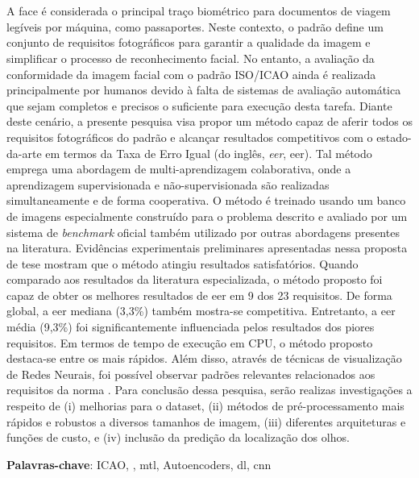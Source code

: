 \section*{}

\noindent
A face é considerada o principal traço biométrico para documentos de viagem legíveis por máquina, como passaportes. Neste contexto, o padrão \icao define um conjunto de requisitos fotográficos para garantir a qualidade da imagem e simplificar o processo de reconhecimento facial. No entanto, a avaliação da conformidade da imagem facial com o padrão ISO/ICAO ainda é realizada principalmente por humanos devido à falta de sistemas de avaliação automática que sejam completos e precisos o suficiente para execução desta tarefa. Diante deste cenário, a presente pesquisa visa propor um método capaz de aferir todos os requisitos fotográficos do padrão \icao e alcançar resultados competitivos com o estado-da-arte em termos da Taxa de Erro Igual (do inglês, \textit{\acl{eer}}, \acs{eer}). Tal método emprega uma abordagem de multi-aprendizagem colaborativa, onde a aprendizagem supervisionada e não-supervisionada são realizadas simultaneamente e de forma cooperativa. O método é treinado usando um banco de imagens especialmente construído para o problema descrito e avaliado por um sistema de \textit{benchmark} oficial também utilizado por outras abordagens presentes na literatura. Evidências experimentais preliminares apresentadas nessa proposta de tese mostram que o método atingiu resultados satisfatórios. Quando comparado aos resultados da literatura especializada, o método proposto foi capaz de obter os melhores resultados de \acs{eer} em 9 dos 23 requisitos. De forma global, a \acs{eer} mediana (3,3\%) também mostra-se competitiva. Entretanto, a \acs{eer} média (9,3\%) foi significantemente influenciada pelos resultados dos piores requisitos. Em termos de tempo de execução em CPU, o método proposto destaca-se entre os mais rápidos. Além disso, através de técnicas de visualização de Redes Neurais, foi possível observar padrões relevantes relacionados aos requisitos da norma \icao. Para conclusão dessa pesquisa, serão realizas investigações a respeito de (i) melhorias para o dataset, (ii) métodos de pré-processamento mais rápidos e robustos a diversos tamanhos de imagem, (iii) diferentes arquiteturas e funções de custo, e (iv) inclusão da predição da localização dos olhos.

\vspace{2em}

\noindent
\textbf{Palavras-chave}: ICAO, \icao, \acl{mtl}, Autoencoders, \acl{dl}, \acl{cnn}

\newpage
